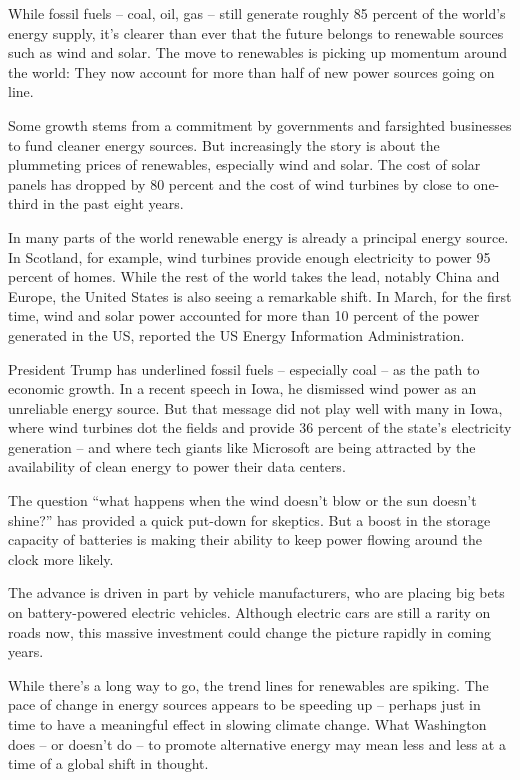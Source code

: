While fossil fuels – coal, oil, gas – still generate roughly 85 percent of the world's energy supply, it's clearer than ever that the future belongs to renewable sources such as wind and solar. The move to renewables is picking up momentum around the world: They now account for more than half of new power sources going on line.


Some growth stems from a commitment by governments and farsighted businesses to fund cleaner energy sources. But increasingly the story is about the plummeting prices of renewables, especially wind and solar. The cost of solar panels has dropped by 80 percent and the cost of wind turbines by close to one-third in the past eight years.


In many parts of the world renewable energy is already a principal energy source. In Scotland, for example, wind turbines provide enough electricity to power 95 percent of homes. While the rest of the world takes the lead, notably China and Europe, the United States is also seeing a remarkable shift. In March, for the first time, wind and solar power accounted for more than 10 percent of the power generated in the US, reported the US Energy Information Administration.


President Trump has underlined fossil fuels – especially coal – as the path to economic growth. In a recent speech in Iowa, he dismissed wind power as an unreliable energy source. But that message did not play well with many in Iowa, where wind turbines dot the fields and provide 36 percent of the state's electricity generation – and where tech giants like Microsoft are being attracted by the availability of clean energy to power their data centers.


The question ``what happens when the wind doesn't blow or the sun doesn't shine?'' has provided a quick put-down for skeptics. But a boost in the storage capacity of batteries is making their ability to keep power flowing around the clock more likely.


The advance is driven in part by vehicle manufacturers, who are placing big bets on battery-powered electric vehicles. Although electric cars are still a rarity on roads now, this massive investment could change the picture rapidly in coming years.


While there's a long way to go, the trend lines for renewables are spiking. The pace of change in energy sources appears to be speeding up – perhaps just in time  to have a meaningful effect in slowing climate change. What Washington does – or doesn't do – to promote alternative energy may mean less and less at a time of a global shift in thought.